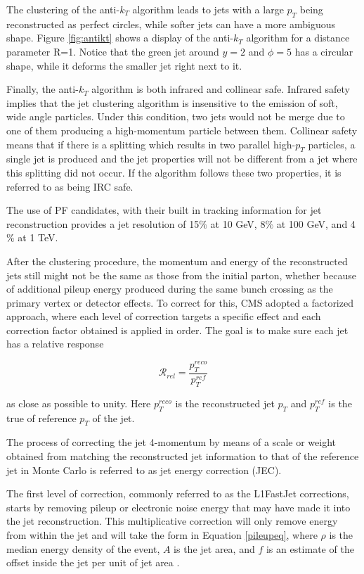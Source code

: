 The clustering of the anti-$k_{T}$ algorithm leads to jets with a large $p_{T}$ being reconstructed as perfect circles, while softer jets can have a more ambiguous shape. Figure \ref{fig:antikt} shows a display of the anti-$k_{T}$ algorithm for a distance parameter R=1. Notice that the green jet around $y=2$ and $\phi=5$ has a circular shape, while it deforms the smaller jet right next to it.

Finally, the anti-$k_{T}$ algorithm is both infrared and collinear safe. Infrared safety implies that the jet clustering algorithm is insensitive to the emission of soft, wide angle particles. Under this condition, two jets would not be merge due to one of them producing a high-momentum particle between them. Collinear safety means that if there is a splitting which results in two parallel high-$p_{T}$ particles, a single jet is produced and the jet properties will not be different from a jet where this splitting did not occur. If the algorithm follows these two properties, it is referred to as being IRC safe.

The use of PF candidates, with their built in tracking information for jet reconstruction provides a jet resolution of 15$\%$ at 10 GeV, 8$\%$ at 100 GeV, and 4$\%$ at 1 TeV\cite{CMS-PAS-PFT-09-001}. 

After the clustering procedure, the momentum and energy of the reconstructed jets still might not be the same as those from the initial parton, whether because of additional pileup energy produced during the same bunch crossing as the primary vertex or detector effects. To correct for this, CMS adopted a factorized approach\cite{JINST2011}, where each level of correction targets a specific effect and each correction factor obtained is applied in order. The goal is to make sure each jet has a relative response

\begin{equation}
\mathcal{R}_{rel} = \frac{p_{T}^{reco}}{p_{T}^{ref}} 
\end{equation}

as close as possible to unity. Here $p_{T}^{reco}$ is the reconstructed jet $p_{T}$ and $p_{T}^{ref}$ is the true of reference $p_{T}$ of the jet. 

The process of correcting the jet 4-momentum by means of a scale or weight obtained from matching the reconstructed jet information to that of the reference jet in Monte Carlo is referred to as jet energy correction (JEC).

The first level of correction, commonly referred to as the L1FastJet\cite{Cacciari2007} corrections, starts by removing pileup or electronic noise energy that may have made it into the jet reconstruction. This multiplicative correction will only remove energy from within the jet and will take the form in Equation \ref{pileupeq}, where $\rho$ is the median energy density of the event, $A$ is the jet area, and $f$ is an estimate of the offset inside the jet per unit of jet area \cite{JINST2011,Cacciari2007}.

